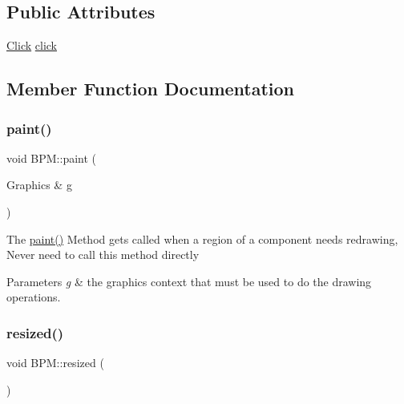 \subsection*{Public Attributes}
\begin{DoxyCompactItemize}
\item 
\mbox{\hyperlink{class_click}{Click}} \mbox{\hyperlink{class_b_p_m_a4663b64aa536da31f5cb6d414a3d36ff}{click}}
\end{DoxyCompactItemize}


\subsection{Member Function Documentation}
\mbox{\label{class_b_p_m_a351beef46e2b82b3b9afccef8eab9550}} 
\subsubsection{\texorpdfstring{paint()}{paint()}}
{\footnotesize\ttfamily void B\+P\+M\+::paint (\begin{DoxyParamCaption}\item[{Graphics \&}]{g }\end{DoxyParamCaption})\hspace{0.3cm}{\ttfamily [override]}}

The \mbox{\hyperlink{class_b_p_m_a351beef46e2b82b3b9afccef8eab9550}{paint()}} Method gets called when a region of a component needs redrawing, Never need to call this method directly


\begin{DoxyParams}{Parameters}
{\em g} & the graphics context that must be used to do the drawing operations. \\
\hline
\end{DoxyParams}
\mbox{\label{class_b_p_m_a1065fcee8c76482b4da7327453ccf59a}} 
\subsubsection{\texorpdfstring{resized()}{resized()}}
{\footnotesize\ttfamily void B\+P\+M\+::resized (\begin{DoxyParamCaption}{ }\end{DoxyParamCaption})\hspace{0.3cm}{\ttfamily [override]}}

